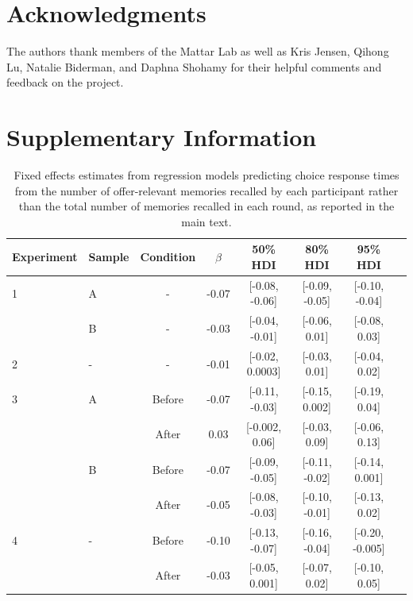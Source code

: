 \documentclass[10pt,letterpaper]{article}
\begin{document}



\section{Acknowledgments}
The authors thank members of the Mattar Lab as well as Kris Jensen, Qihong Lu, Natalie Biderman, and Daphna Shohamy for their helpful comments and feedback on the project.


\onecolumn  %
\setcounter{figure}{0}
\setcounter{table}{0}
\renewcommand{\thefigure}{S\arabic{figure}}
\renewcommand{\thetable}{S\arabic{table}}

\section{Supplementary Information}

\begin{table}[h!]
\centering
\begin{tabular}{llcccccc}
\hline
Experiment & Sample & Condition & $\beta$ & 50\% HDI & 80\% HDI & 95\% HDI \\
\hline
1 & A & - & -0.07 & [-0.08, -0.06] & [-0.09, -0.05] & [-0.10, -0.04] \\
  & B & - & -0.03 & [-0.04, -0.01] & [-0.06, 0.01] & [-0.08, 0.03] \\
2 & - & - & -0.01 & [-0.02, 0.0003] & [-0.03, 0.01] & [-0.04, 0.02] \\
\hline
3 & A & Before & -0.07 & [-0.11, -0.03] & [-0.15, 0.002] & [-0.19, 0.04] \\
  &   & After & 0.03 & [-0.002, 0.06] & [-0.03, 0.09] & [-0.06, 0.13] \\
  & B & Before & -0.07 & [-0.09, -0.05] & [-0.11, -0.02] & [-0.14, 0.001] \\
  &   & After & -0.05 & [-0.08, -0.03] & [-0.10, -0.01] & [-0.13, 0.02] \\
4 & - & Before & -0.10 & [-0.13, -0.07] & [-0.16, -0.04] & [-0.20, -0.005] \\
  &   & After & -0.03 & [-0.05, 0.001] & [-0.07, 0.02] & [-0.10, 0.05] \\
\hline
\end{tabular}
\caption{Fixed effects estimates from regression models predicting choice response times from the number of offer-relevant memories recalled by each participant rather than the total number of memories recalled in each round, as reported in the main text.}
\label{tab:suppRT}
\end{table}
\end{document}
